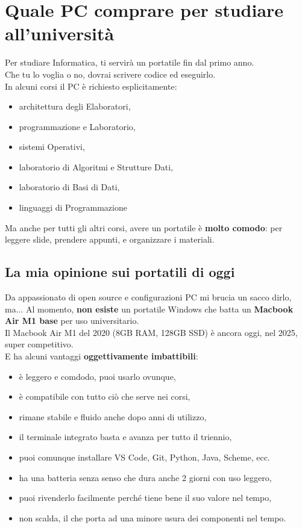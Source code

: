 \documentclass{article}
\begin{document}
\section{Quale PC comprare per studiare all’università}
Per studiare Informatica, ti servirà un portatile fin dal primo anno.\\
Che tu lo voglia o no, dovrai scrivere codice ed eseguirlo.\\
In alcuni corsi il PC è richiesto esplicitamente:
\begin{itemize}
\item architettura degli Elaboratori,
\item programmazione e Laboratorio,
\item sistemi Operativi,
\item laboratorio di Algoritmi e Strutture Dati,
\item laboratorio di Basi di Dati,
\item linguaggi di Programmazione
\end{itemize}
Ma anche per tutti gli altri corsi, avere un portatile è \textbf{molto comodo}: per leggere slide, prendere appunti, e organizzare i materiali.


\subsection{La mia opinione sui portatili di oggi}
Da appassionato di open source e configurazioni PC mi brucia un sacco dirlo, ma...
Al momento, \textbf{non esiste} un portatile Windows che batta un \textbf{Macbook Air M1 base} per uso universitario.\\
Il Macbook Air M1 del 2020 (8GB RAM, 128GB SSD) è ancora oggi, nel 2025, super competitivo.\\
E ha alcuni vantaggi \textbf{oggettivamente imbattibili}:
\begin{itemize}
\item è leggero e comdodo, puoi usarlo ovunque,
\item è compatibile con tutto ciò che serve nei corsi,
\item rimane stabile e fluido anche dopo anni di utilizzo,
\item il terminale integrato basta e avanza per tutto il triennio,
\item puoi comunque installare VS Code, Git, Python, Java, Scheme, ecc.
\item ha una batteria senza senso che dura anche 2 giorni con uso leggero,
\item puoi rivenderlo facilmente perché tiene bene il suo valore nel tempo,
\item non scalda, il che porta ad una minore usura dei componenti nel tempo.
\end{itemize}
\end{document}
